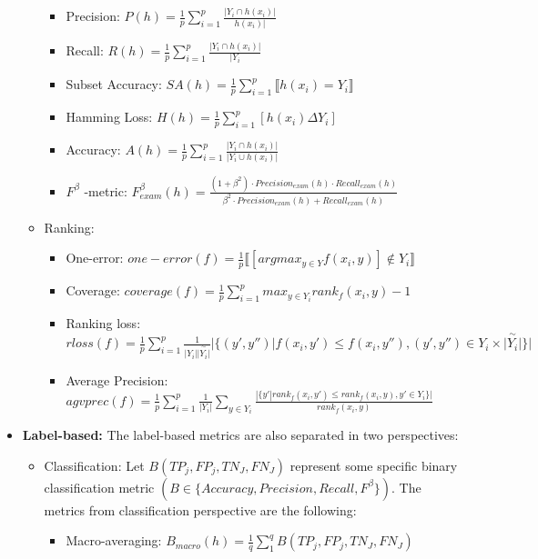 \documentclass[12pt]{report}
\begin{document}
\begin{itemize}
\begin{itemize}
			\begin{itemize}
				\item Precision: $P(h) = \frac{1}{p} \sum_{i=1}^{p} \frac{|Y_i \cap h(x_i)|}{h(x_i)|}$
				\item Recall: $R(h) = \frac{1}{p} \sum_{i=1}^{p} \frac{|Y_i \cap h(x_i)|}{|Y_i}$
        \item Subset Accuracy:  $SA(h) = \frac{1}{p} \sum_{i=1}^p \llbracket h(x_i) = Y_i \rrbracket$
				\item Hamming Loss: $H(h) = \frac{1}{p} \sum_{i=1}^{p} [h(x_i)\Delta Y_i] $
				\item Accuracy: $A(h) = \frac{1}{p} \sum_{i=1}^{p} \frac{|Y_i \cap h(x_i)|}{|Y_i \cup h(x_i)|}$
				\item $F^ \beta$ -metric:  $F^ \beta _{exam} (h) = \frac{(1+ \beta ^2) \cdot Precision_{exam}(h) \cdot Recall_{exam}(h)}{\beta ^2 \cdot Precision_{exam}(h) + Recall_{exam}(h)}$
			\end{itemize}
			\item Ranking:
			\begin{itemize}
				\item One-error: $one-error(f) = \frac{1}{p} \llbracket [argmax_{y \in Y}f(x_i,y)] \notin Y_i \rrbracket$
				\item Coverage:  $coverage(f) = \frac{1}{p} \sum_{i=1}^{p} max_{y \in Y_i} rank_f(x_i,y) - 1$
				\item Ranking loss: $rloss(f) = \frac{1}{p} \sum_{i=1}^{p} \frac{1}{|Y_i| {\overset{\sim}{|Y_i|}}} |\{(y', y'') | f(x_i,y') \leq f(x_i,y''), (y', y'') \in Y_i \times {\overset{\sim}{|Y_i|}} \}| $ 
				\item Average Precision:  $agvprec(f) = \frac{1}{p} \sum_{i=1}^{p} \frac{1}{|Y_i|} \sum_{y \in Y_i} \frac{|\{y' | rank_f(x_i,y') \leq rank_f(x_i,y), y' \in Y_i\}|}{rank_f(x_i,y)}$
			\end{itemize}
		\end{itemize}
  \item \textbf{Label-based: }
		The label-based metrics are also separated in two perspectives:
		\begin{itemize}
			\item Classification: Let $B(TP_j, FP_j, TN_J, FN_J)$ represent some specific binary classification metric $(B \in \{Accuracy, Precision, Recall, F^ \beta \})$. The metrics from classification perspective are the following:
			\begin{itemize}
				\item Macro-averaging: $B_{macro}(h) = \frac{1}{q} \sum_{1}^{q} B(TP_j, FP_j, TN_J, FN_J)$

\end{itemize}
\end{itemize}
\end{itemize}
\end{document}
